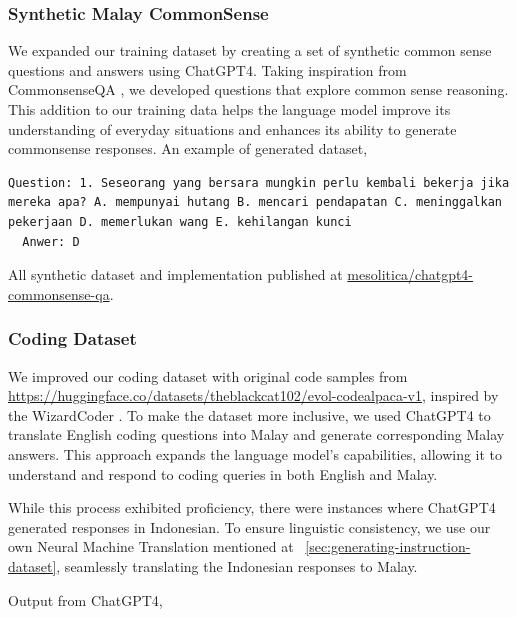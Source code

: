 \documentclass{article}
\begin{document}
\subsubsection{Synthetic Malay CommonSense}

We expanded our training dataset by creating a set of synthetic common sense questions and answers using ChatGPT4. Taking inspiration from CommonsenseQA \cite{talmor2019commonsenseqa}, we developed questions that explore common sense reasoning. This addition to our training data helps the language model improve its understanding of everyday situations and enhances its ability to generate commonsense responses. An example of generated dataset,

\begin{lstlisting}[breaklines=true]
  Question: 1. Seseorang yang bersara mungkin perlu kembali bekerja jika mereka apa? A. mempunyai hutang B. mencari pendapatan C. meninggalkan pekerjaan D. memerlukan wang E. kehilangan kunci
  Anwer: D
\end{lstlisting}

All synthetic dataset and implementation published at \href{https://huggingface.co/datasets/mesolitica/chatgpt4-commonsense-qa}{mesolitica/chatgpt4-commonsense-qa}.

\pagebreak

\subsubsection{Coding Dataset}

We improved our coding dataset with original code samples from \url{https://huggingface.co/datasets/theblackcat102/evol-codealpaca-v1}, inspired by the WizardCoder \cite{luo2023wizardcoder}. To make the dataset more inclusive, we used ChatGPT4 to translate English coding questions into Malay and generate corresponding Malay answers. This approach expands the language model's capabilities, allowing it to understand and respond to coding queries in both English and Malay.

While this process exhibited proficiency, there were instances where ChatGPT4 generated responses in Indonesian. To ensure linguistic consistency, we use our own Neural Machine Translation mentioned at ~\ref{sec:generating-instruction-dataset}, seamlessly translating the Indonesian responses to Malay.

Output from ChatGPT4,
\end{document}
